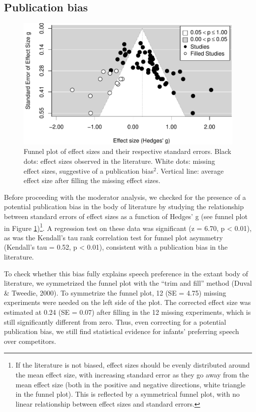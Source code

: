 \documentclass[
  man,mask,floatsintext]{apa6}
\begin{document}
\hypertarget{publication-bias}{%
\subsection{Publication bias}\label{publication-bias}}

\begin{figure}
\centering
\includegraphics{MA_speech_pref_files/figure-latex/bias-1.pdf}
\caption{\label{fig:bias}Funnel plot of effect sizes and their respective standard errors. Black dots: effect sizes observed in the literature. White dots: missing effect sizes, suggestive of a publication bias\(^2\). Vertical line: average effect size after filling the missing effect sizes.}
\end{figure}

Before proceeding with the moderator analysis, we checked for the presence of a potential publication bias in the body of literature by studying the relationship between standard errors of effect sizes as a function of Hedges' g (see funnel plot in Figure \ref{fig:bias})\footnote{If the literature is not biased, effect sizes should be evenly distributed around the mean effect size, with increasing standard error as they go away from the mean effect size (both in the positive and negative directions, white triangle in the funnel plot). This is reflected by a symmetrical funnel plot, with no linear relationship between effect sizes and standard errors.}. A regression test on these data was significant (z = 6.70, p \textless{} 0.01), as was the Kendall's tau rank correlation test for funnel plot asymmetry (Kendall's tau = 0.52, p \textless{} 0.01), consistent with a publication bias in the literature.

To check whether this bias fully explains speech preference in the extant body of literature, we symmetrized the funnel plot with the ``trim and fill'' method (Duval \& Tweedie, 2000). To symmetrize the funnel plot, 12 (SE = 4.75) missing experiments were needed on the left side of the plot. The corrected effect size was estimated at 0.24 (SE = 0.07) after filling in the 12 missing experiments, which is still significantly different from zero. Thus, even correcting for a potential publication bias, we still find statistical evidence for infants' preferring speech over competitors.
\end{document}
